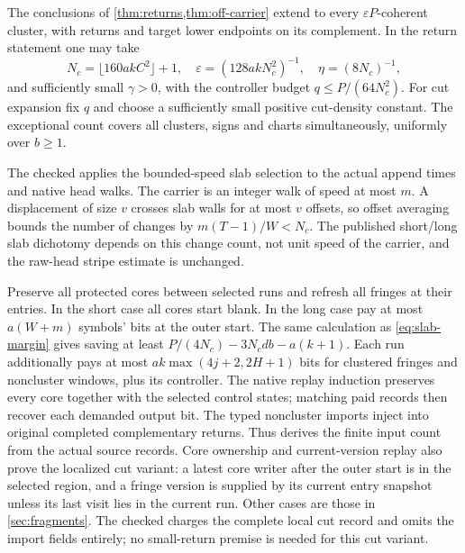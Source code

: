\begin{theorem}\label{thm:clusters}
The conclusions of \cref{thm:returns,thm:off-carrier} extend to every
$\varepsilon P$-coherent cluster, with returns and target lower endpoints on
its complement. In the return statement one may take
\[
 N_c=\lfloor160akC^2\rfloor+1,\quad
 \varepsilon=(128akN_c^2)^{-1},\quad \eta=(8N_c)^{-1},
\]
and sufficiently small $\gamma>0$, with the controller budget
$q\le P/(64N_c^2)$. For cut expansion fix $q$ and choose a sufficiently small
positive cut-density constant. The exceptional count covers all clusters,
signs and charts simultaneously, uniformly over $b\ge1$.
\end{theorem}
\begin{outline}
The checked  applies the bounded-speed
slab selection to the actual append times and native head walks. The carrier
is an integer walk of speed at most $m$. A displacement of size
$v$ crosses slab walls for at most $v$ offsets, so offset averaging bounds
the number of changes by $m(T-1)/W<N_c$. The published short/long slab
dichotomy depends on this change count, not unit speed of the carrier, and
the raw-head stripe estimate is unchanged.

Preserve all protected cores between selected runs and refresh all fringes
at their entries. In the short case all cores start blank. In the long case
pay at most $a(W+m)$ symbols' bits at the outer start. The same calculation
as \cref{eq:slab-margin} gives saving at least
$P/(4N_c)-3N_cdb-a(k+1)$. Each run additionally pays at most
$ak\max(4j+2,2H+1)$ bits for clustered fringes and noncluster windows,
plus its controller. The native replay induction preserves every core together with the selected
control states; matching paid records then recover each demanded output bit.
The typed noncluster imports inject into original completed complementary
returns. Thus  derives the finite
input count from the actual source records. Core ownership and current-version replay also prove the localized
cut variant: a latest core writer after the outer start is in the selected
region, and a fringe version is supplied by its current entry snapshot unless
its last visit lies in the current run. Other cases are those in
\cref{sec:fragments}. The checked
 charges the complete local cut record
and omits the import fields entirely; no small-return premise is needed for
this cut variant.


\end{outline}
